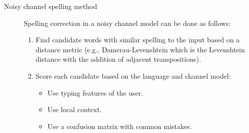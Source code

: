 \begin{description}
    \item[Noisy channel spelling method]
        Spelling correction in a noisy channel model can be done as follows:
        \begin{enumerate}
            \item Find candidate words with similar spelling to the input based on a distance metric (e.g., Damerau-Levenshtein which is the Levenshtein distance with the addition of adjacent transpositions).
            \item Score each candidate based on the language and channel model:
            \begin{itemize}
                \item Use typing features of the user.
                \item Use local context.
                \item Use a confusion matrix with common mistakes.
            \end{itemize}
        \end{enumerate}
\end{description}

